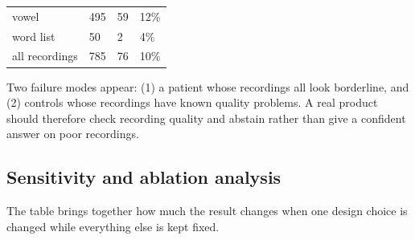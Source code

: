 \documentclass[11pt,a4paper]{article}
\begin{document}
\begin{center}
\begin{longtable}{>{\raggedright\arraybackslash}p{3.71cm}>{\raggedleft\arraybackslash}p{3.71cm}>{\raggedleft\arraybackslash}p{3.71cm}>{\raggedleft\arraybackslash}p{3.71cm}}
\hspace{0pt}vowel & \hspace{0pt}495 & \hspace{0pt}59 & \hspace{0pt}12\%\\
\hspace{0pt}word list & \hspace{0pt}50 & \hspace{0pt}2 & \hspace{0pt}4\%\\
\hspace{0pt}all recordings & \hspace{0pt}785 & \hspace{0pt}76 & \hspace{0pt}10\%\\
\end{longtable}\end{center}
\begin{tcolorbox}[colback=blue!3,colframe=blue!50!black,boxrule=0.5pt,arc=2pt,left=5pt,right=5pt,top=3pt,bottom=3pt,title={\small\bfseries What this tells us}]\small Two failure modes appear: (1) a patient whose recordings all look borderline, and (2) controls whose recordings have known quality problems. A real product should therefore check recording quality and abstain rather than give a confident answer on poor recordings.\end{tcolorbox}
\subsection{Sensitivity and ablation analysis}\label{sec:sensitivity}
The table brings together how much the result changes when one design choice is changed while everything else is kept fixed.
\end{document}
